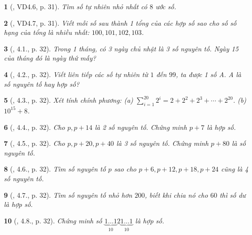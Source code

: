 \documentclass{article}
\newtheorem{baitoan}{}
\begin{document}
\begin{baitoan}[\cite{TLCT_THCS_Toan_6_so_hoc}, VD4.6, p. 31]
	Tìm số tự nhiên nhỏ nhất có $8$ ước số.
\end{baitoan}

\begin{baitoan}[\cite{TLCT_THCS_Toan_6_so_hoc}, VD4.7, p. 31]
	Viết mỗi số sau thành 1 tổng của các hợp số sao cho số số hạng của tổng là nhiều nhất: $100,101,102,103$.
\end{baitoan}

\begin{baitoan}[\cite{TLCT_THCS_Toan_6_so_hoc}, 4.1., p. 32]
	Trong 1 tháng, có 3 ngày chủ nhật là 3 số nguyên tố. Ngày 15 của tháng đó là ngày thứ mấy?
\end{baitoan}

\begin{baitoan}[\cite{TLCT_THCS_Toan_6_so_hoc}, 4.2., p. 32]
	Viết liên tiếp các số tự nhiên từ $1$ đến $99$, ta được 1 số A. A là số nguyên tố hay hợp số?
\end{baitoan}

\begin{baitoan}[\cite{TLCT_THCS_Toan_6_so_hoc}, 4.3., p. 32]
	Xét tính chính phương: (a) $\sum_{i=1}^{20} 2^i = 2 + 2^2 + 2^3 + \cdots + 2^{20}$. (b) $10^{15} + 8$.
\end{baitoan}

\begin{baitoan}[\cite{TLCT_THCS_Toan_6_so_hoc}, 4.4., p. 32]
	Cho $p,p + 14$ là 2 số nguyên tố. Chứng minh $p + 7$ là hợp số.
\end{baitoan}

\begin{baitoan}[\cite{TLCT_THCS_Toan_6_so_hoc}, 4.5., p. 32]
	Cho $p,p + 20,p + 40$ là 3 số nguyên tố. Chứng minh $p + 80$ là số nguyên tố.
\end{baitoan}

\begin{baitoan}[\cite{TLCT_THCS_Toan_6_so_hoc}, 4.6., p. 32]
	Tìm số nguyên tố $p$ sao cho $p + 6,p + 12,p + 18,p + 24$ cũng là 4 số nguyên tố.
\end{baitoan}

\begin{baitoan}[\cite{TLCT_THCS_Toan_6_so_hoc}, 4.7., p. 32]
	Tìm số nguyên tố nhỏ hơn $200$, biết khi chia nó cho $60$ thì số dư là hợp số.
\end{baitoan}

\begin{baitoan}[\cite{TLCT_THCS_Toan_6_so_hoc}, 4.8., p. 32]
	Chứng minh số $\underbrace{1\ldots1}_{10}2\underbrace{1\ldots1}_{10}$ là hợp số.
\end{baitoan}
\end{document}
